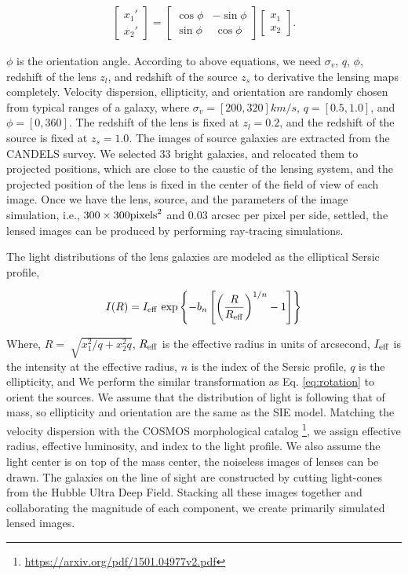 \documentclass{emulateapj}
\begin{document}
\begin{eqnarray}
\label{eq:rotation}
\begin{bmatrix}

    x_{1}\prime      \\
    x_{2}\prime 
\end{bmatrix}
= 
\begin{bmatrix}
    \cos \phi  &  -\sin \phi      \\
    \sin \phi  &  ~\cos \phi      
\end{bmatrix} 
\begin{bmatrix}
    x_1      \\
    x_2      
\end{bmatrix} .
\end{eqnarray}

$\phi$ is the orientation angle.  According to above equations, we
need $\sigma_v$, $q$, $\phi$, redshift of the lens $z_l$, and redshift
of the source $z_s$ to derivative the lensing maps completely.
Velocity dispersion, ellipticity, and orientation are randomly chosen
from typical ranges of a galaxy, where $\sigma_v = [200, 320] km/s$,
$q = [0.5, 1.0]$, and $\phi = [0, 360]$. The redshift of the lens is
fixed at $z_l = 0.2$, and the redshift of the source is fixed at $z_s
= 1.0$. The images of source galaxies are extracted from the CANDELS
survey. We selected 33 bright galaxies, and relocated them to
projected positions, which are close to the caustic of the lensing
system, and the projected position of the lens is fixed in the center
of the field of view of each image. Once we have the lens, source, and
the parameters of the image simulation, i.e., $300 \times 300 {\rm
  pixels}^2$ and 0.03 arcsec per pixel per side, settled, the lensed
images can be produced by performing ray-tracing simulations.

The light distributions of the lens galaxies  are modeled as the elliptical Sersic profile,

\begin{equation}
I(R) = I_{\rm eff}~{\rm exp} \left\lbrace -b_{n} \left[ \left(
  \frac{R}{R_{\rm eff}}\right)^{1/n} - 1 \right ] \right\rbrace
\end{equation}


Where, $R = \sqrt[]{x_1^2 /q+x_2^2 q }$, $R_{\rm eff}$ is the
effective radius in units of arcsecond, $I_{\rm eff}$ is the intensity
at the effective radius, $n$ is the index of the Sersic profile, $q$
is the ellipticity, and We perform the similar transformation as
Eq. \ref{eq:rotation} to orient the sources.  We assume that the
distribution of light is following that of mass, so ellipticity and
orientation are the same as the SIE model. Matching the velocity
dispersion with the COSMOS morphological
catalog \footnote{\url{https://arxiv.org/pdf/1501.04977v2.pdf}}, we
assign effective radius, effective luminosity, and index to the light
profile.  We also assume the light center is on top of the mass
center, the noiseless images of lenses can be drawn. The galaxies on
the line of sight are constructed by cutting light-cones from the
Hubble Ultra Deep Field.  Stacking all these images together and
collaborating the magnitude of each component, we create primarily
simulated lensed images.
\end{document}
